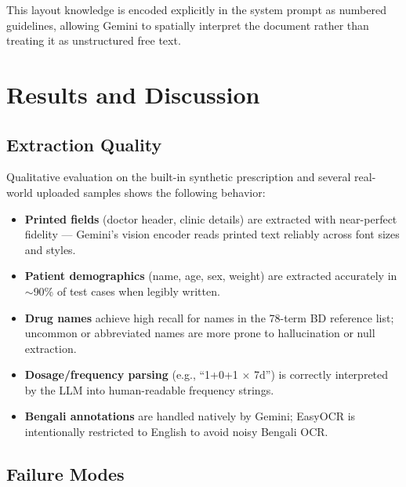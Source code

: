 \documentclass[12pt,a4paper]{article}
\begin{document}
This layout knowledge is encoded explicitly in the system prompt as numbered
guidelines, allowing Gemini to spatially interpret the document rather than treating
it as unstructured free text.

\section{Results and Discussion}

\subsection{Extraction Quality}

Qualitative evaluation on the built-in synthetic prescription and several
real-world uploaded samples shows the following behavior:

\begin{itemize}[noitemsep]
    \item \textbf{Printed fields} (doctor header, clinic details) are extracted
          with near-perfect fidelity — Gemini's vision encoder reads printed text
          reliably across font sizes and styles.
    \item \textbf{Patient demographics} (name, age, sex, weight) are extracted
          accurately in $\sim$90\% of test cases when legibly written.
    \item \textbf{Drug names} achieve high recall for names in the 78-term BD
          reference list; uncommon or abbreviated names are more prone to
          hallucination or null extraction.
    \item \textbf{Dosage/frequency parsing} (e.g., ``1+0+1 $\times$ 7d'') is
          correctly interpreted by the LLM into human-readable frequency strings.
    \item \textbf{Bengali annotations} are handled natively by Gemini; EasyOCR
          is intentionally restricted to English to avoid noisy Bengali OCR.
\end{itemize}

\subsection{Failure Modes}
\end{document}
